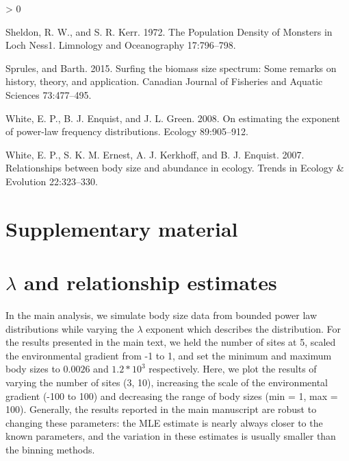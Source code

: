 \documentclass[
]{article}
\newcommand{\beginsupplement}{ \setcounter{table}{0} \renewcommand{\thetable}{S\arabic{table}} \setcounter{figure}{0} \renewcommand{\thefigure}{S\arabic{figure}}}
\newlength{\cslhangindent}
\newenvironment{CSLReferences}[2] %
 {%
  \setlength{\parindent}{0pt}
  \ifodd #1 \everypar{\setlength{\hangindent}{\cslhangindent}}\ignorespaces\fi
  \ifnum #2 > 0
  \setlength{\parskip}{#2\baselineskip}
  \fi
 }%
 {}
\begin{document}
\begin{CSLReferences}{1}{0}
\leavevmode\hypertarget{ref-Sheldon1972}{}%
Sheldon, R. W., and S. R. Kerr. 1972. The {Population Density} of
{Monsters} in {Loch Ness1}. Limnology and Oceanography 17:796--798.

\leavevmode\hypertarget{ref-sprules2015}{}%
Sprules, and Barth. 2015. Surfing the biomass size spectrum: Some
remarks on history, theory, and application. Canadian Journal of
Fisheries and Aquatic Sciences 73:477--495.

\leavevmode\hypertarget{ref-white2008}{}%
White, E. P., B. J. Enquist, and J. L. Green. 2008. On estimating the
exponent of power-law frequency distributions. Ecology 89:905--912.

\leavevmode\hypertarget{ref-White2007}{}%
White, E. P., S. K. M. Ernest, A. J. Kerkhoff, and B. J. Enquist. 2007.
Relationships between body size and abundance in ecology. Trends in
Ecology \& Evolution 22:323--330.

\end{CSLReferences}

\newpage

\hypertarget{supplementary-material}{%
\section*{Supplementary material}\label{supplementary-material}}

\beginsupplement

\hypertarget{lambda-and-relationship-estimates}{%
\section{\texorpdfstring{\(\lambda\) and relationship
estimates}{\textbackslash lambda and relationship estimates}}\label{lambda-and-relationship-estimates}}

In the main analysis, we simulate body size data from bounded power law
distributions while varying the \(\lambda\) exponent which describes the
distribution. For the results presented in the main text, we held the
number of sites at 5, scaled the environmental gradient from -1 to 1,
and set the minimum and maximum body sizes to \(0.0026\) and
\(1.2 *10^3\) respectively. Here, we plot the results of varying the
number of sites (3, 10), increasing the scale of the environmental
gradient (-100 to 100) and decreasing the range of body sizes (min = 1,
max = 100). Generally, the results reported in the main manuscript are
robust to changing these parameters: the MLE estimate is nearly always
closer to the known parameters, and the variation in these estimates is
usually smaller than the binning methods.
\end{document}

